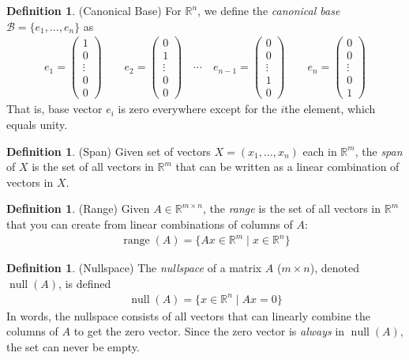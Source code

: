 \documentclass[12pt]{article}
\numberwithin{equation}{section} %
\theoremstyle{plain}
\theoremstyle{definition}
\newtheorem{defn}[thm]{Definition}
\theoremstyle{remark}
\newcommand{\Rn}{\mathbb{R}^n}
\newcommand{\Rm}{\mathbb{R}^m}
\newcommand{\Rmn}{\mathbb{R}^{m\times n}}
\newcommand{\nul}{\operatorname{null}}
\newcommand{\range}{\operatorname{range}}
\begin{document}
\begin{defn}{(Canonical Base)}
For $\Rn$, we define the \emph{canonical base}
$\mathcal{B}=\{e_1,\ldots,e_n\}$ as
\begin{align*}
  e_1 =
  \begin{pmatrix}
  1 \\ 0 \\ \vdots \\ 0 \\ 0
  \end{pmatrix}
  \qquad
  e_2 =
  \begin{pmatrix}
  0 \\ 1 \\ \vdots \\ 0 \\ 0
  \end{pmatrix}
  \quad \cdots \quad
  e_{n-1} =
  \begin{pmatrix}
  0 \\ 0 \\ \vdots \\ 1 \\ 0
  \end{pmatrix}
  \qquad
  e_n =
  \begin{pmatrix}
  0 \\ 0 \\ \vdots \\ 0 \\ 1
  \end{pmatrix}
\end{align*}
That is, base vector $e_i$ is zero everywhere except for the $i$the
element, which equals unity.
\end{defn}

\begin{defn}(Span)
Given set of vectors $X=(x_1,\ldots,x_n)$ each in $\Rm$, the
\emph{span} of $X$ is the set of all vectors in $\Rm$ that can be
written as a linear combination of vectors in $X$.
\end{defn}

\begin{defn}(Range)
Given $A\in\Rmn$, the \emph{range} is the set of all vectors in $\Rm$
that you can create from linear combinations of columns of $A$:
\begin{align*}
  \range(A)
  =\{Ax\in\Rm\;|\; x\in\Rn\}
\end{align*}
\end{defn}

\begin{defn}(Nullspace)
The \emph{nullspace} of a matrix $A$ ($m\times n$), denoted
$\nul(A)$, is defined
\begin{align*}
  \nul(A)
  = \{x\in\Rn\;|\; Ax = 0\}
\end{align*}
In words, the nullspace consists of all vectors that can linearly
combine the columns of $A$ to get the zero vector.
Since the zero vector is \emph{always} in $\nul(A)$, the set can never
be empty.
\end{defn}
\end{document}
